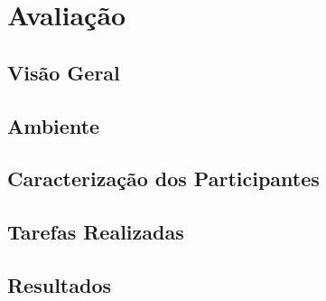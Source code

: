 \chapter{Avaliação} \label{ch:avaliacao}

\section{Visão Geral}
\section{Ambiente}
\section{Caracterização dos Participantes}
\section{Tarefas Realizadas}
\section{Resultados}
